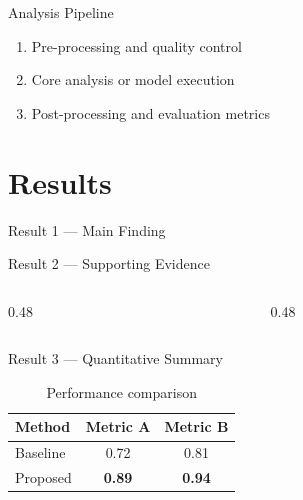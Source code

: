 \documentclass[aspectratio=169,11pt]{beamer}
\begin{document}
\begin{frame}{Analysis Pipeline}
  \begin{enumerate}
    \item Pre-processing and quality control
    \item Core analysis or model execution
    \item Post-processing and evaluation metrics
  \end{enumerate}
\end{frame}

\section{Results}

\begin{frame}{Result 1 — Main Finding}
  \begin{center}
  \end{center}
\end{frame}

\begin{frame}{Result 2 — Supporting Evidence}
  \begin{columns}[T]
    \begin{column}{0.48\textwidth}
    \end{column}
    \begin{column}{0.48\textwidth}
    \end{column}
  \end{columns}
\end{frame}

\begin{frame}{Result 3 — Quantitative Summary}
  \begin{table}
    \caption{Performance comparison}
    \begin{tabular}{lcc}
      \toprule
      Method & Metric A & Metric B \\
      \midrule
      Baseline & 0.72 & 0.81 \\
      Proposed & \textbf{0.89} & \textbf{0.94} \\
      \bottomrule
    \end{tabular}
  \end{table}
\end{frame}
\end{document}
